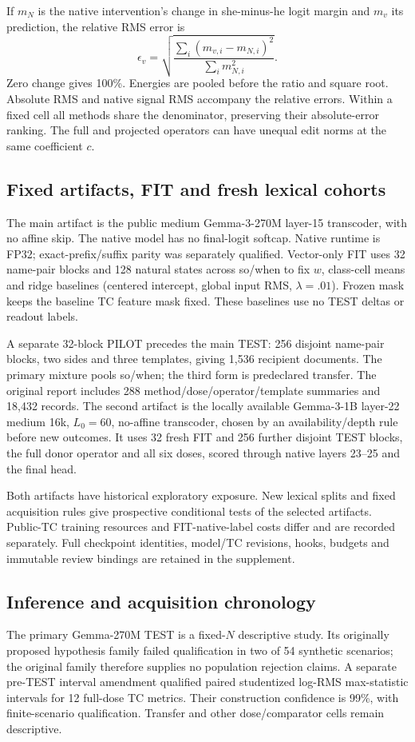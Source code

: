 \documentclass[11pt]{article}
\begin{document}
If $m_N$ is the native intervention's change in she-minus-he logit margin and $m_v$ its prediction, the relative RMS error is
\[
 \epsilon_v=\sqrt{\frac{\sum_i(m_{v,i}-m_{N,i})^2}{\sum_i m_{N,i}^2}}.
\]
Zero change gives 100\%. Energies are pooled before the ratio and square root. Absolute RMS and native signal RMS accompany the relative errors. Within a fixed cell all methods share the denominator, preserving their absolute-error ranking. The full and projected operators can have unequal edit norms at the same coefficient $c$.

\subsection{Fixed artifacts, FIT and fresh lexical cohorts}
The main artifact is the public medium Gemma-3-270M layer-15 transcoder, with no affine skip. The native model has no final-logit softcap. Native runtime is FP32; exact-prefix/suffix parity was separately qualified. Vector-only FIT uses 32 name-pair blocks and 128 natural states across so/when to fix $w$, class-cell means and ridge baselines (centered intercept, global input RMS, $\lambda=.01$). Frozen mask keeps the baseline TC feature mask fixed. These baselines use no TEST deltas or readout labels.

A separate 32-block PILOT precedes the main TEST: 256 disjoint name-pair blocks, two sides and three templates, giving 1,536 recipient documents. The primary mixture pools so/when; the third form is predeclared transfer. The original report includes 288 method/dose/operator/template summaries and 18,432 records. The second artifact is the locally available Gemma-3-1B layer-22 medium 16k, $L_0=60$, no-affine transcoder, chosen by an availability/depth rule before new outcomes. It uses 32 fresh FIT and 256 further disjoint TEST blocks, the full donor operator and all six doses, scored through native layers 23--25 and the final head.

Both artifacts have historical exploratory exposure. New lexical splits and fixed acquisition rules give prospective conditional tests of the selected artifacts. Public-TC training resources and FIT-native-label costs differ and are recorded separately. Full checkpoint identities, model/TC revisions, hooks, budgets and immutable review bindings are retained in the supplement.

\subsection{Inference and acquisition chronology}
The primary Gemma-270M TEST is a fixed-$N$ descriptive study. Its originally proposed hypothesis family failed qualification in two of 54 synthetic scenarios; the original family therefore supplies no population rejection claims. A separate pre-TEST interval amendment qualified paired studentized log-RMS max-statistic intervals for 12 full-dose TC metrics. Their construction confidence is 99\%, with finite-scenario qualification. Transfer and other dose/comparator cells remain descriptive.
\end{document}
